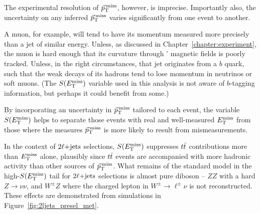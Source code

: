 The experimental resolution of $\vec p_\mathrm{T}^\mathrm{\:miss}$, however, is imprecise.
Importantly also, the uncertainty on any inferred $\vec p_\mathrm{T}^\mathrm{\:miss}$ varies
significantly from one event to another.

A muon, for example, will tend to have its momentum measured more precisely
than a jet of similar energy.
Unless, as discussed in Chapter~\ref{chapter:experiment}, the muon is hard
enough that its curvature through \atlas' magnetic fields is poorly tracked.
Unless, in the right circumstances, that jet originates from a $b$ quark,
such that the weak decays of its hadrons tend to lose momentum in
neutrinos or soft muons. (The $S(E_\mathrm{T}^\mathrm{miss})$ variable used in this analysis is not
aware of $b$-tagging information, but perhaps it could benefit from some.)

By incorporating an uncertainty in $\vec p_\mathrm{T}^\mathrm{\:miss}$ tailored to each event, the
variable $S(E_\mathrm{T}^\mathrm{miss})$ helps to separate those events with real and well-measured
$E_\mathrm{T}^\mathrm{miss}$ from those where the measures $\vec p_\mathrm{T}^\mathrm{\:miss}$ is more likely to result from
mismeasurements.

In the context of $2\ell\mathrm{+jets}$ selections, $S(E_\mathrm{T}^\mathrm{miss})$ suppresses $t\bar t$
contributions more than $E_\mathrm{T}^\mathrm{miss}$ alone, plausibly since $t\bar t$ events are
accompanied with more hadronic activity than other sources of $\vec p_\mathrm{T}^\mathrm{\:miss}$.
What remains of the standard model in the high-$S(E_\mathrm{T}^\mathrm{miss})$ tail for $2\ell\mathrm{+jets}$
selections is almost pure diboson -- $ZZ$ with a hard $Z\rightarrow \nu\nu$,
and $W^\pm Z$ where the charged lepton in $W^\pm\rightarrow\ell^\pm\nu$
is not reconstructed.
These effects are demonstrated from simulations in
Figure~\ref{fig:2ljets_presel_met}.


